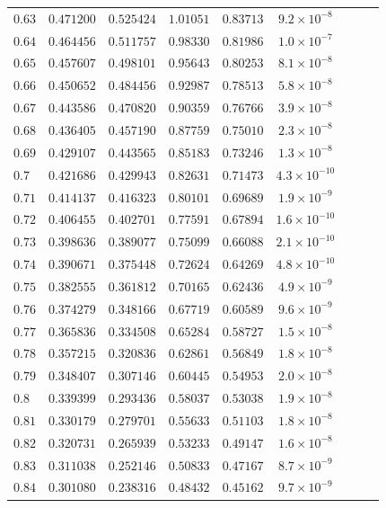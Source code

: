 \documentclass[12pt]{extarticle}
\theoremstyle{plain}
\theoremstyle{remark}
\begin{document}
\begin{longtable}{lcccccccc}
$0.63$ & $0.471200$ & $0.525424$ & $1.01051$ & $0.83713$ & $9.2\times10^{-8}$ \\
$0.64$ & $0.464456$ & $0.511757$ & $0.98330$ & $0.81986$ & $1.0\times10^{-7}$ \\
$0.65$ & $0.457607$ & $0.498101$ & $0.95643$ & $0.80253$ & $8.1\times10^{-8}$ \\
$0.66$ & $0.450652$ & $0.484456$ & $0.92987$ & $0.78513$ & $5.8\times10^{-8}$ \\
$0.67$ & $0.443586$ & $0.470820$ & $0.90359$ & $0.76766$ & $3.9\times10^{-8}$ \\
$0.68$ & $0.436405$ & $0.457190$ & $0.87759$ & $0.75010$ & $2.3\times10^{-8}$ \\
$0.69$ & $0.429107$ & $0.443565$ & $0.85183$ & $0.73246$ & $1.3\times10^{-8}$ \\
$0.7$ & $0.421686$ & $0.429943$ & $0.82631$ & $0.71473$ & $4.3\times10^{-10}$ \\
$0.71$ & $0.414137$ & $0.416323$ & $0.80101$ & $0.69689$ & $1.9\times10^{-9}$ \\
$0.72$ & $0.406455$ & $0.402701$ & $0.77591$ & $0.67894$ & $1.6\times10^{-10}$ \\
$0.73$ & $0.398636$ & $0.389077$ & $0.75099$ & $0.66088$ & $2.1\times10^{-10}$ \\
$0.74$ & $0.390671$ & $0.375448$ & $0.72624$ & $0.64269$ & $4.8\times10^{-10}$ \\
$0.75$ & $0.382555$ & $0.361812$ & $0.70165$ & $0.62436$ & $4.9\times10^{-9}$ \\
$0.76$ & $0.374279$ & $0.348166$ & $0.67719$ & $0.60589$ & $9.6\times10^{-9}$ \\
$0.77$ & $0.365836$ & $0.334508$ & $0.65284$ & $0.58727$ & $1.5\times10^{-8}$ \\
$0.78$ & $0.357215$ & $0.320836$ & $0.62861$ & $0.56849$ & $1.8\times10^{-8}$ \\
$0.79$ & $0.348407$ & $0.307146$ & $0.60445$ & $0.54953$ & $2.0\times10^{-8}$ \\
$0.8$ & $0.339399$ & $0.293436$ & $0.58037$ & $0.53038$ & $1.9\times10^{-8}$ \\
$0.81$ & $0.330179$ & $0.279701$ & $0.55633$ & $0.51103$ & $1.8\times10^{-8}$ \\
$0.82$ & $0.320731$ & $0.265939$ & $0.53233$ & $0.49147$ & $1.6\times10^{-8}$ \\
$0.83$ & $0.311038$ & $0.252146$ & $0.50833$ & $0.47167$ & $8.7\times10^{-9}$ \\
$0.84$ & $0.301080$ & $0.238316$ & $0.48432$ & $0.45162$ & $9.7\times10^{-9}$ \\

\end{longtable}
\end{document}
